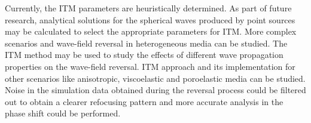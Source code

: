 Currently, the \ac{ITM} parameters are heuristically determined. As part of future research, analytical solutions for the spherical waves produced by point sources may be calculated to select the appropriate parameters for \ac{ITM}. More complex scenarios and wave-field reversal in heterogeneous media can be studied. 
The \ac{ITM} method may be used to study the effects of different wave propagation properties on the wave-field reversal. \ac{ITM} approach and its implementation 
for other scenarios like anisotropic, viscoelastic and poroelastic media can be studied. Noise in the simulation data obtained during the reversal process
could be filtered out to obtain a clearer refocusing pattern and more accurate analysis in the phase shift could be performed.\\